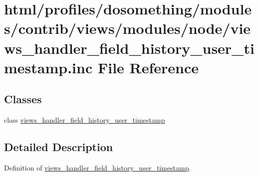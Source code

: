 \hypertarget{views__handler__field__history__user__timestamp_8inc}{
\section{html/profiles/dosomething/modules/contrib/views/modules/node/views\_\-handler\_\-field\_\-history\_\-user\_\-timestamp.inc File Reference}
\label{views__handler__field__history__user__timestamp_8inc}
}
\subsection*{Classes}
\begin{DoxyCompactItemize}
\item 
class \hyperlink{classviews__handler__field__history__user__timestamp}{views\_\-handler\_\-field\_\-history\_\-user\_\-timestamp}
\end{DoxyCompactItemize}


\subsection{Detailed Description}
Definition of \hyperlink{classviews__handler__field__history__user__timestamp}{views\_\-handler\_\-field\_\-history\_\-user\_\-timestamp}. 